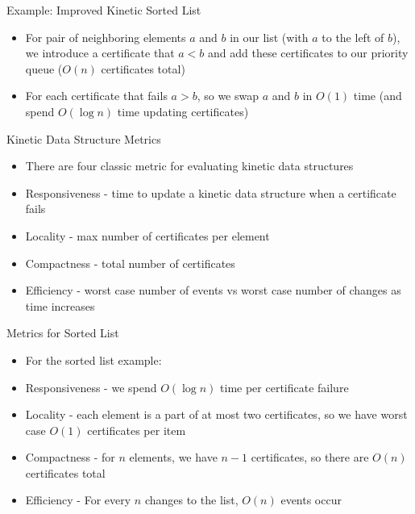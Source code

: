 \documentclass[aspectratio=169, handout]{beamer}
\begin{document}
\begin{frame}{Example: Improved Kinetic Sorted List}
    \begin{itemize}
        \item For pair of neighboring elements $a$ and $b$ in our list (with $a$ to the left of $b$), we introduce a certificate that $a < b$ and add these certificates to our priority queue ($O(n)$ certificates total)
        \item For each certificate that fails $a > b$, so we swap $a$ and $b$ in $O(1)$ time (and spend $O(\log n)$ time updating certificates)
    \end{itemize}
\end{frame}

\begin{frame}{Kinetic Data Structure Metrics}
    \begin{itemize}
        \item There are four classic metric for evaluating kinetic data structures
        \pause
        \item Responsiveness - time to update a kinetic data structure when a certificate fails
        \item Locality - max number of certificates per element
        \item Compactness - total number of certificates
        \item Efficiency - worst case number of events vs worst case number of changes as time increases
    \end{itemize}
    \nocite{wiki1}
\end{frame}

\begin{frame}{Metrics for Sorted List}
    \begin{itemize}
        \item For the sorted list example:
        \item Responsiveness - we spend $O(\log n)$ time per certificate failure
        \item Locality - each element is a part of at most two certificates, so we have worst case $O(1)$ certificates per item
        \item Compactness - for $n$ elements, we have $n - 1$ certificates, so there are $O(n)$ certificates total
        \item Efficiency - For every $n$ changes to the list, $O(n)$ events occur
    \end{itemize}
\end{frame}
\end{document}
